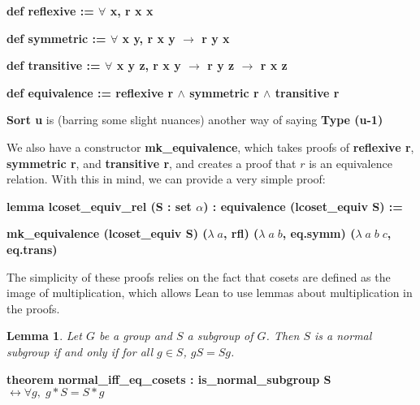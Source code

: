 \documentclass[runningheads,a4paper]{llncs}
\renewcommand{\a}{\alpha}
\renewcommand{\l}{\lambda}
\renewcommand{\-}{\setminus}
\newtheorem{lemma}[theorem]{Lemma}
\begin{document}
\vspace{2 mm}
\hspace{2 em}\textbf{def reflexive := $\forall$ x, r x x}

\hspace{2 em}\textbf{def symmetric := $\forall$ {x y}, r x y $\to$ r y x}

\hspace{2 em}\textbf{def transitive := $\forall$ {x y z}, r x y $\to$ r y z $\to$ r x z}

\hspace{2 em}\textbf{def equivalence := reflexive r $\land$ symmetric r $\land$ transitive r}
\vspace{2 mm}

\textbf{Sort u} is (barring some slight nuances) another way of saying \textbf{Type (u-1)}

We also have a constructor \textbf{mk\_equivalence}, which takes proofs of \textbf{reflexive r}, \textbf{symmetric r}, and \textbf{transitive r}, and creates a proof that $r$ is an equivalence relation. With this in mind, we can provide a very simple proof:

\vspace{2 mm}
\hspace{2 em}\textbf{lemma lcoset\_equiv\_rel (S : set $\a$) : equivalence (lcoset\_equiv S) :=}

\hspace{4 em}\textbf{mk\_equivalence (lcoset\_equiv S) ($\l\; a$, rfl) ($\l\;a\;b$, eq.symm) ($\l\;a\;b\;c$, eq.trans)}
\vspace{2 mm}

The simplicity of these proofs relies on the fact that cosets are defined as the image of multiplication, which allows Lean to use lemmas about multiplication in the proofs.

\begin{lemma}
Let $G$ be a group and $S$ a subgroup of $G$. Then $S$ is a normal subgroup if and only if for all $g \in S$, $gS = Sg$.
\end{lemma}

\vspace{2 mm}
\hspace{2 em}\textbf{theorem normal\_iff\_eq\_cosets : is\_normal\_subgroup S $\leftrightarrow \forall g,\; g * S = S * g$}
\vspace{2 mm}

\end{document}
